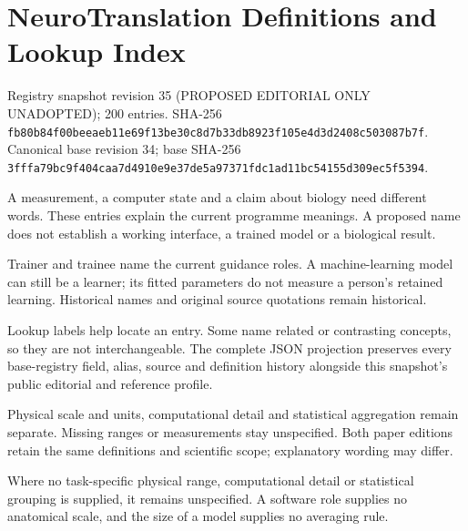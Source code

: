 \section*{NeuroTranslation Definitions and Lookup Index}
\label{programme-definitions}
\noindent Registry snapshot revision 35 (PROPOSED EDITORIAL ONLY UNADOPTED); 200 entries. SHA-256 \texttt{fb80b84f\allowbreak{}00beeaeb\allowbreak{}11e69f13\allowbreak{}be30c8d7\allowbreak{}b33db892\allowbreak{}3f105e4d\allowbreak{}3d2408c5\allowbreak{}03087b7f}. Canonical base revision 34; base SHA-256 \texttt{3fffa79b\allowbreak{}c9f404ca\allowbreak{}a7d4910e\allowbreak{}9e37de5a\allowbreak{}97371fdc\allowbreak{}1ad11bc5\allowbreak{}4155d309\allowbreak{}ec5f5394}.\par
\noindent A measurement, a computer state and a claim about biology need different words. These entries explain the current programme meanings. A proposed name does not establish a working interface, a trained model or a biological result.\par
\noindent Trainer and trainee name the current guidance roles. A machine-learning model can still be a learner; its fitted parameters do not measure a person's retained learning. Historical names and original source quotations remain historical.\par
\noindent Lookup labels help locate an entry. Some name related or contrasting concepts, so they are not interchangeable. The complete JSON projection preserves every base-registry field, alias, source and definition history alongside this snapshot's public editorial and reference profile.\par
\noindent Physical scale and units, computational detail and statistical aggregation remain separate. Missing ranges or measurements stay unspecified. Both paper editions retain the same definitions and scientific scope; explanatory wording may differ.\par

\noindent Where no task-specific physical range, computational detail or statistical grouping is supplied, it remains unspecified. A software role supplies no anatomical scale, and the size of a model supplies no averaging rule.\par

